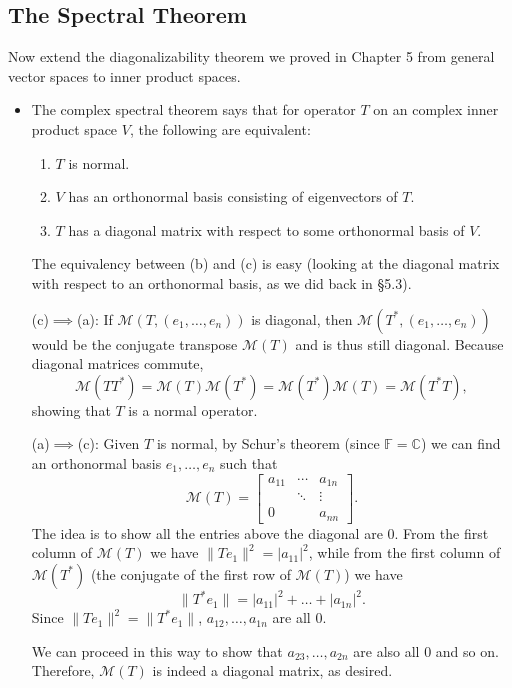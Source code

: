 \documentclass{article}
\newcommand{\C}{\mathbb{C}}
\newcommand{\F}{\mathbb{F}}
\newcommand{\nm}[1]{\| #1 \|}
\newcommand{\M}{\mathcal{M}}
\begin{document}
\subsection{The Spectral Theorem}
Now extend the diagonalizability theorem we proved in Chapter 5 from general vector spaces to inner product spaces. 
\begin{itemize}
    \item The complex spectral theorem says that for operator $T$ on an complex inner product space $V$, the following are equivalent:
    \begin{enumerate}[label=(\alph*)]
        \item $T$ is normal.
        \item $V$ has an orthonormal basis consisting of eigenvectors of $T$.
        \item $T$ has a diagonal matrix with respect to some orthonormal basis of $V$.
    \end{enumerate}
    
    The equivalency between (b) and (c) is easy (looking at the diagonal matrix with respect to an orthonormal basis, as we did back in \S 5.3).
    
    (c)$\implies$(a): If $\M(T,(e_1,\dots,e_n))$ is diagonal, then $\M(T^*,(e_1,\dots,e_n))$ would be the conjugate transpose $\M(T)$ and is thus still diagonal. Because diagonal matrices commute, $$\M(TT^*)=\M(T)\M(T^*)=\M(T^*)\M(T)=\M(T^*T),$$ showing that $T$ is a normal operator.
    
    (a)$\implies$(c): Given $T$ is normal, by Schur's theorem (since $\F = \C$) we can find an orthonormal basis $e_1,\dots,e_n$ such that
    \begin{equation*}
        \M(T)=
        \begin{bmatrix}
            a_{11} & \cdots & a_{1n} \\
            & \ddots & \vdots \\
            0 & & a_{nn}
        \end{bmatrix}.
    \end{equation*}
    The idea is to show all the entries above the diagonal are 0. From the first column of $\M(T)$ we have $\nm{Te_1}^2=|a_{11}|^2$, while from the first column of $\M(T^*)$ (the conjugate of the first row of $\M(T)$) we have $$\nm{T^*e_1}=|a_{11}|^2+\dots+|a_{1n}|^2.$$ Since $\nm{Te_1}^2 = \nm{T^*e_1}$, $a_{12},\dots,a_{1n}$ are all 0.
    
    We can proceed in this way to show that $a_{23},\dots,a_{2n}$ are also all 0 and so on. Therefore, $\M(T)$ is indeed a diagonal matrix, as desired.
\end{itemize}
\end{document}
